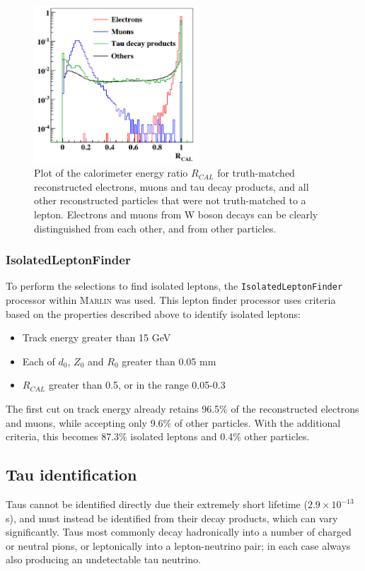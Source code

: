 \begin{figure}[p]
	\centering
	\includegraphics[width=0.55\textwidth]{../Pictures/Analysis/cal-energy.png}
	\caption{Plot of the calorimeter energy ratio $R_{CAL}$ for truth-matched reconstructed electrons, muons and tau decay products, and all other reconstructed particles that were not truth-matched to a lepton. Electrons and muons from W boson decays can be clearly distinguished from each other, and from  other particles.}
	\label{figure:analysis/leptons/cal-energy}
\end{figure}

\subsubsection{IsolatedLeptonFinder}
To perform the selections to find isolated leptons, the \texttt{IsolatedLeptonFinder} processor within \textsc{Marlin} was used. This lepton finder processor uses criteria based on the properties described above to identify isolated leptons:

\begin{itemize}
	\item Track energy greater than 15 GeV
	\item Each of $d_0$, $Z_0$ and $R_0$ greater than 0.05 mm
	\item $R_{CAL}$ greater than 0.5, or in the range 0.05-0.3	
\end{itemize}

The first cut on track energy already retains 96.5\% of the reconstructed electrons and muons, while accepting only 9.6\% of other particles. With the additional criteria, this becomes 87.3\% isolated leptons and 0.4\% other particles.

\subsection{Tau identification}
Taus cannot be identified directly due their extremely short lifetime ($2.9 \times 10^{-13}$s), and must instead be identified from their decay products, which can vary significantly. Taus most commonly decay hadronically into a number of charged or neutral pions, or leptonically into a lepton-neutrino pair; in each case always also producing an undetectable tau neutrino. 

